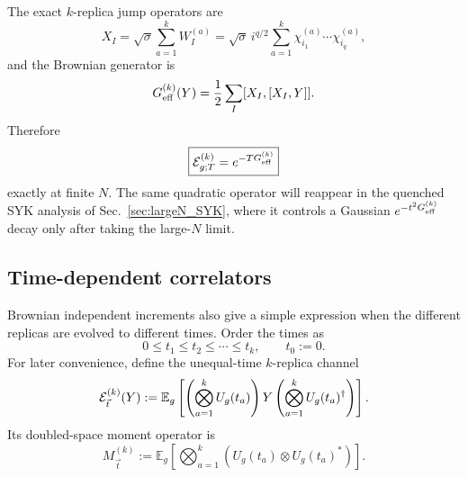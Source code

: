\documentclass{article}
\theoremstyle{definition}
\begin{document}
The exact $k$-replica jump operators are
\begin{equation}
    X_I
    =\sqrt\sigma\sum_{a=1}^kW_I^{(a)}
    =\sqrt\sigma\,i^{q/2}
      \sum_{a=1}^k
      \chi_{i_1}^{(a)}\cdots\chi_{i_q}^{(a)},
\end{equation}
and the Brownian generator is
\begin{equation}
    G_{\rm eff}^{(k)}(Y)
    =\frac12\sum_I[X_I,[X_I,Y]].
\end{equation}
Therefore
\begin{equation}
    \boxed{
    {\cal E}_{g;T}^{(k)}=e^{-TG_{\rm eff}^{(k)}}
    }
\end{equation}
exactly at finite $N$.  The same quadratic operator will reappear in the
quenched SYK analysis of Sec.~\ref{sec:largeN_SYK}, where it controls a
Gaussian $e^{-t^2G_{\rm eff}^{(k)}}$ decay only after taking the large-$N$
limit.

\subsection{Time-dependent correlators}
\label{subsec:brownian_syk_time_correlators}

Brownian independent increments also give a simple expression when the
different replicas are evolved to different times.  Order the times as
\begin{equation}
    0\leq t_1\leq t_2\leq\cdots\leq t_k,
    \qquad
    t_0:=0.
    \label{eq:brownian_ordered_times}
\end{equation}
For later convenience, define the unequal-time $k$-replica channel
\begin{equation}
    {\cal E}^{(k)}_{\vec t}(Y)
    :=
    \mathbb E_g
    \left[
       \left(
          \bigotimes_{a=1}^k U_g(t_a)
       \right)
       Y
       \left(
          \bigotimes_{a=1}^k U_g(t_a)^\dagger
       \right)
    \right].
    \label{eq:brownian_unequal_channel}
\end{equation}
Its doubled-space moment operator is
\begin{equation}
    M^{(k)}_{\vec t}
    :=
    \mathbb E_g
    \left[
       \bigotimes_{a=1}^k
       \left(
          U_g(t_a)\otimes U_g(t_a)^*
       \right)
    \right].
    \label{eq:brownian_unequal_moment}
\end{equation}
\end{document}
